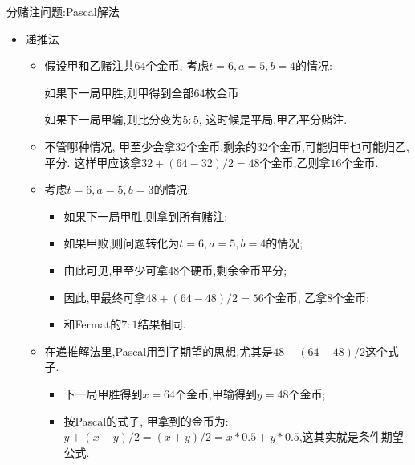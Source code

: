 \documentclass[Prob-All.tex]{subfiles}
\begin{document}
\begin{frame}{分赌注问题:{\rm Pascal}解法}
	\begin{itemize}[<+-|alert@+>]
		\item 递推法
		\begin{itemize}[<+-|alert@+>]
			\item 假设甲和乙赌注共$64$个金币, 考虑$t=6,a=5,b=4$的情况:

			如果下一局甲胜,则甲得到全部64枚金币

			如果下一局甲输,则比分变为$5:5$, 这时候是平局,甲乙平分赌注.

			\item 不管哪种情况, 甲至少会拿$32$个金币,剩余的$32$个金币,可能归甲也可能归乙,平分. 这样甲应该拿$32+(64-32)/2=48$个金币,乙则拿$16$个金币.
			\item 考虑$t=6,a=5,b=3$的情况:
			\begin{itemize}[<+-|alert@+>]
				\item 如果下一局甲胜,则拿到所有赌注;
				\item 如果甲败,则问题转化为$t=6,a=5,b=4$的情况;
				\item 由此可见,甲至少可拿48个硬币,剩余金币平分;
				\item 因此,甲最终可拿$48+(64-48)/2=56$个金币, 乙拿8个金币;
				\item 和Fermat的$7:1$结果相同.
			\end{itemize}





		\item 在递推解法里,Pascal用到了期望的思想,尤其是$48+(64-48)/2$这个式子.
		\begin{itemize}[<+-|alert@+>]
			\item 下一局甲胜得到$x=64$个金币,甲输得到$y=48$个金币;
			\item 按Pascal的式子, 甲拿到的金币为: $y+(x-y)/2=(x+y)/2=x*0.5+y*0.5$,这其实就是条件期望公式.
		\end{itemize}

		\end{itemize}

	\end{itemize}

	\end{frame}
\end{document}

